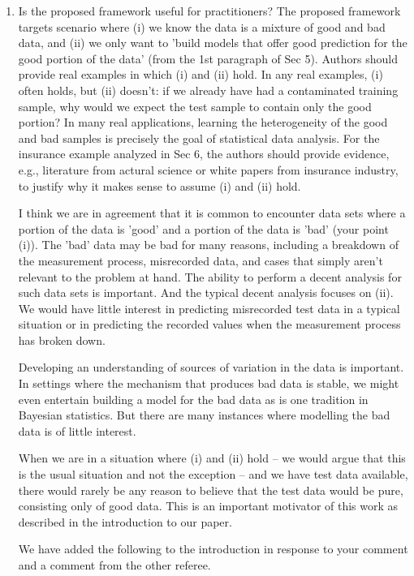 \documentclass{article}
\newcommand{\response}[1]{{\color{blue}#1}}
\begin{document}
\begin{enumerate}
\item Is the proposed framework useful for practitioners? The proposed framework targets scenario where (i) we know the data is a mixture of good and bad data, and (ii) we only want to 'build models that offer good prediction for the good portion of the data' (from the 1st paragraph of Sec 5). Authors should provide real examples in which (i) and (ii) hold. In any real examples, (i) often holds, but (ii) doesn't: if we already have had a contaminated training sample, why would we expect the test sample to contain only the good portion? In many real applications, learning the heterogeneity of the good and bad samples is precisely the goal of statistical data analysis.
For the insurance example analyzed in Sec 6, the authors should provide evidence, e.g., literature from actural science or white papers from insurance industry, to justify why it makes sense to assume (i) and (ii) hold.

\response{I think we are in agreement that it is common to encounter data sets where a portion of the data is 'good' and a portion of the data is 'bad' (your point (i)).  The 'bad' data may be bad for many reasons, including a breakdown of the measurement process, misrecorded data, and cases that simply aren't relevant to the problem at hand.  The ability to perform a decent analysis for such data sets is important.  And the typical decent analysis focuses on (ii).  We would have little interest in predicting misrecorded test data in a typical situation or in predicting the recorded values when the measurement process has broken down.  

Developing an understanding of sources of variation in the data is important.  In settings where the mechanism that produces bad data is stable, we might even entertain building a model for the bad data as is one tradition in Bayesian statistics.  But there are many instances where modelling the bad data is of little interest.  

When we are in a situation where (i) and (ii) hold -- we would argue that this is the usual situation and not the exception -- and we have test data available, there would rarely be any reason to believe that the test data would be pure, consisting only of good data.  This is an important motivator of this work as described in the introduction to our paper. 

We have added the following to the introduction in response to your comment and a comment from the other referee.  

}
\end{enumerate}
\end{document}
